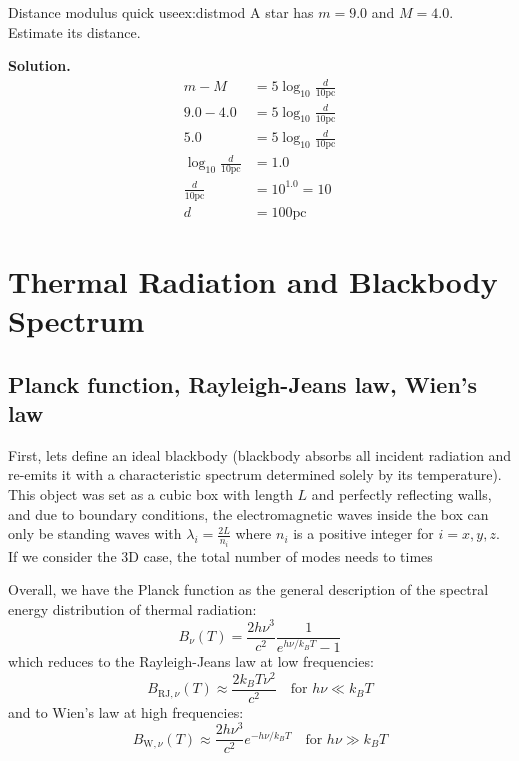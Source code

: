 \bigskip\noindent
\begin{example}{Distance modulus quick use}{ex:distmod}
    A star has $m=9.0$ and $M=4.0$. Estimate its distance.

    \smallskip\textbf{Solution.}
    \begin{align*}
        m-M &= 5\log_{10}\frac{d}{10 \text{pc}} \\
        9.0 - 4.0 &= 5\log_{10}\frac{d}{10 \text{pc}} \\
        5.0 &= 5\log_{10}\frac{d}{10 \text{pc}} \\
        \log_{10}\frac{d}{10 \text{pc}} &= 1.0 \\
        \frac{d}{10 \text{pc}} &= 10^{1.0} = 10 \\
        d &= 100 \text{pc}
    \end{align*}
\end{example}

\clearpage
\section{Thermal Radiation and Blackbody Spectrum}
\subsection{Planck function, Rayleigh-Jeans law, Wien's law}
\bigskip\noindent
\begin{foundation}
    First, lets define an ideal blackbody (blackbody absorbs all incident radiation and re-emits it with a characteristic spectrum determined solely by its temperature). This object was set as a cubic box with length $L$ and perfectly reflecting walls, and due to boundary conditions, the electromagnetic waves inside the box can only be standing waves with $\lambda_i = \frac{2L}{n_i}$ where $n_i$ is a positive integer for $i=x,y,z$. If we consider the 3D case, the total number of modes needs to times 
\end{foundation}


\begin{theory}
    Overall, we have the Planck function as the general description of the spectral energy distribution of thermal radiation:
    \begin{equation}
        B_\nu(T) = \frac{2h\nu^3}{c^2}\frac{1}{e^{h\nu/k_B T}-1}
    \end{equation}
    which reduces to the Rayleigh-Jeans law at low frequencies:
    \begin{equation}
        B_{\text{RJ},\nu}(T) \approx \frac{2k_B T \nu^2}{c^2} \quad \text{for } h\nu \ll k_B T
    \end{equation}
    and to Wien's law at high frequencies:
    \begin{equation}
        B_{\text{W},\nu}(T) \approx \frac{2h\nu^3}{c^2} e^{-h\nu/k_B T} \quad \text{for } h\nu \gg k_B T
    \end{equation}
\end{theory}


